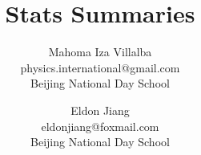 \documentclass[a4paper,11pt]{book}
\title{Stats Summaries}
\date{}
\author{
  Mahoma Iza Villalba\\
  physics.international@gmail.com\\
  Beijing National Day School
  \and
  Eldon Jiang\\
  eldonjiang@foxmail.com\\
  Beijing National Day School
}
\begin{document}
\maketitle
\tableofcontents
					












\begin{appendices}



\end{appendices}

\printindex
%
\end{document}
